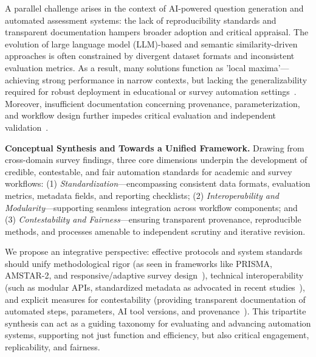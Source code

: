 \documentclass[sigconf]{acmart}
\begin{document}
A parallel challenge arises in the context of AI-powered question generation and automated assessment systems: the lack of reproducibility standards and transparent documentation hampers broader adoption and critical appraisal. The evolution of large language model (LLM)-based and semantic similarity-driven approaches is often constrained by divergent dataset formats and inconsistent evaluation metrics. As a result, many solutions function as 'local maxima'—achieving strong performance in narrow contexts, but lacking the generalizability required for robust deployment in educational or survey automation settings~\cite{ref1,ref2,ref5,ref9,ref10}. Moreover, insufficient documentation concerning provenance, parameterization, and workflow design further impedes critical evaluation and independent validation~\cite{ref9,ref30,ref43,ref61,ref96,ref98}.

\textbf{Conceptual Synthesis and Towards a Unified Framework.} Drawing from cross-domain survey findings, three core dimensions underpin the development of credible, contestable, and fair automation standards for academic and survey workflows: (1) \textit{Standardization}—encompassing consistent data formats, evaluation metrics, metadata fields, and reporting checklists; (2) \textit{Interoperability and Modularity}—supporting seamless integration across workflow components; and (3) \textit{Contestability and Fairness}—ensuring transparent provenance, reproducible methods, and processes amenable to independent scrutiny and iterative revision.

We propose an integrative perspective: effective protocols and system standards should unify methodological rigor (as seen in frameworks like PRISMA, AMSTAR-2, and responsive/adaptive survey design~\cite{ref43,ref87}), technical interoperability (such as modular APIs, standardized metadata as advocated in recent studies~\cite{ref98,ref106}), and explicit measures for contestability (providing transparent documentation of automated steps, parameters, AI tool versions, and provenance~\cite{ref43,ref96,ref98,ref106}). This tripartite synthesis can act as a guiding taxonomy for evaluating and advancing automation systems, supporting not just function and efficiency, but also critical engagement, replicability, and fairness.
\end{document}
